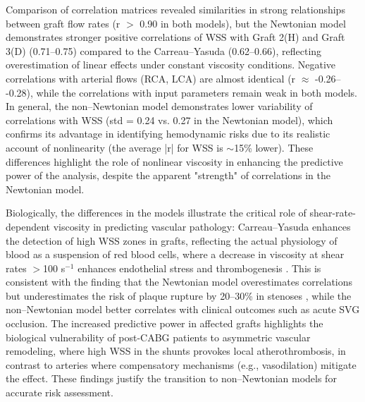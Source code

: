 ﻿\documentclass[12pt,a4paper]{article}
\newcounter{subsubsubsection}[subsubsection]
\theoremstyle{definition}
\numberwithin{equation}{section}
\begin{document}

Comparison of correlation matrices revealed similarities in strong relationships between graft flow rates (r $>$ 0.90 in both models), but the Newtonian model demonstrates stronger positive correlations of WSS with Graft 2(H) and Graft 3(D) (0.71--0.75) compared to the Carreau--Yasuda (0.62--0.66), reflecting overestimation of linear effects under constant viscosity conditions. Negative correlations with arterial flows (RCA, LCA) are almost identical (r $\approx$ -0.26-- -0.28), while the correlations with input parameters remain weak in both models. In general, the non--Newtonian model demonstrates lower variability of correlations with WSS (std = 0.24 vs. 0.27 in the Newtonian model), which confirms its advantage in identifying hemodynamic risks due to its realistic account of nonlinearity (the average |r| for WSS is $\sim$15\% lower). These differences highlight the role of nonlinear viscosity in enhancing the predictive power of the analysis, despite the apparent "strength" of correlations in the Newtonian model.

Biologically, the differences in the models illustrate the critical role of shear-rate-dependent viscosity in predicting vascular pathology: Carreau--Yasuda enhances the detection of high WSS zones in grafts, reflecting the actual physiology of blood as a suspension of red blood cells, where a decrease in viscosity at shear rates $>$100 s$^{-1}$ enhances endothelial stress and thrombogenesis \cite{10.3389/fphys.2020.00861}. This is consistent with the finding that the Newtonian model overestimates correlations but underestimates the risk of plaque rupture by 20--30\% in stenoses \cite{10.1136/neurintsurg-2011-010089}, while the non--Newtonian model better correlates with clinical outcomes such as acute SVG occlusion. The increased predictive power in affected grafts highlights the biological vulnerability of post-CABG patients to asymmetric vascular remodeling, where high WSS in the shunts provokes local atherothrombosis, in contrast to arteries where compensatory mechanisms (e.g., vasodilation) mitigate the effect. These findings justify the transition to non--Newtonian models for accurate risk assessment.
\end{document}
